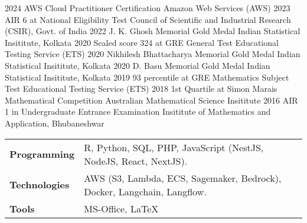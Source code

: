 \documentclass[10pt]{developercv} %
\begin{document}
\begin{entrylist}
    \vspace*{-0.5cm}
    \entry
    {2024}
    {AWS Cloud Practitioner Certification}
    {Amazon Web Services (AWS)}
    {}
    \vspace*{-0.5cm}
    \entry
    {2023}
    {AIR 6 at National Eligibility Test}
    {Council of Scientific and Industrial Research (CSIR), Govt. of India}
    {}
    \vspace*{-0.5cm}
    \entry
    {2022}
    {J. K. Ghosh Memorial Gold Medal}
    {Indian Statistical Insititute, Kolkata}
    {}
    \vspace*{-0.5cm}
    \entry
    {2020}
    {Scaled score 324 at GRE General Test}
    {Educational Testing Service (ETS)}
    {}
    \vspace*{-0.5cm}
    \entry
    {2020}
    {Nikhilesh Bhattacharya Memorial Gold Medal}
    {Indian Statistical Insititute, Kolkata}
    {}
    \vspace*{-0.5cm}
    \entry
    {2020}
    {D. Basu Memorial Gold Medal}
    {Indian Statistical Insititute, Kolkata}
    {}
    \vspace*{-0.5cm}
    \entry
    {2019}
    {93 percentile at GRE Mathematics Subject Test}
    {Educational Testing Service (ETS)}
    {}
    \vspace*{-0.5cm}
    \entry
    {2018}
    {1st Quartile at Simon Marais Mathematical Competition}
    {Australian Mathematical Science Insititute}
    {}
    \vspace*{-0.5cm}
    \entry
    {2016}
    {AIR 1 in Undergraduate Entrance Examination}
    {Insititute of Mathematics and Application, Bhubaneshwar}
    {}
\end{entrylist}

\vspace{-6pt}

\begin{tabular}{p{3cm}l}
    \textbf{Programming} & R, Python, SQL, PHP, JavaScript (NestJS, NodeJS, React, NextJS).\\
    \textbf{Technologies} & AWS (S3, Lambda, ECS, Sagemaker, Bedrock), Docker, Langchain, Langflow.\\
    \textbf{Tools} & MS-Office, \LaTeX\\
\end{tabular}
\end{document}
